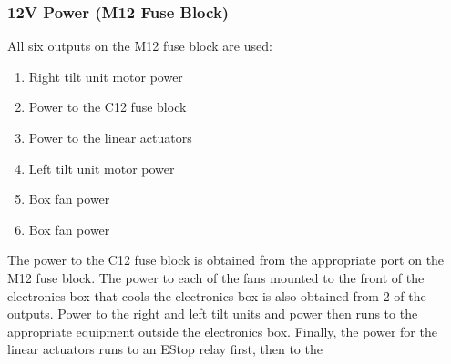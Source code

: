 \subsubsection{12V Power (M12 Fuse Block)}
All six outputs on the M12 fuse block are used:
\begin{enumerate}
\item Right tilt unit motor power
\item Power to the C12 fuse block
\item Power to the linear actuators
\item Left tilt unit motor power
\item Box fan power
\item Box fan power
\end{enumerate}
%
The power to the C12 fuse block is obtained from the appropriate port on the M12 fuse block. The power to each of the fans mounted to the front of the electronics box that cools the electronics box is also obtained from 2 of the outputs. Power to the right and left tilt units and power then runs to the appropriate equipment outside the electronics box. Finally, the power for the linear actuators runs to an EStop relay first, then to the 

